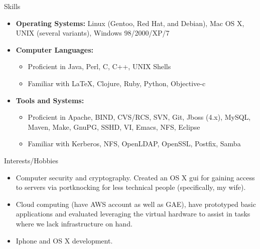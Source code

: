 \documentclass[11pt,oneside]{article}
\newenvironment{ressection}[1]{
	\vspace{4pt}
	{\fontfamily{phv}\selectfont\Large#1}
	\begin{itemize}
	\vspace{3pt}
}{
	\end{itemize}
}
\newcommand{\resitem}[1]{
	\vspace{-4pt}
	\item \begin{flushleft} #1 \end{flushleft}
}
\newcommand{\ressubitem}[1]{
	\vspace{-1pt}
	\item \begin{flushleft} #1 \end{flushleft}
}
\newenvironment{reslist}[1]{
	\resitem{\textbf{#1}}
	\vspace{-5pt}
	\begin{itemize}
}{
	\end{itemize}
}
\begin{document}
\begin{ressection}{Skills}

	\resitem{\textbf{Operating Systems:} Linux (Gentoo, Red Hat, and Debian), Mac OS X, UNIX (several variants), Windows 98/2000/XP/7}

	\begin{reslist}{Computer Languages:}

		\ressubitem{Proficient in Java, Perl, C, C++,  UNIX Shells}

		\ressubitem{Familiar with \LaTeX, Clojure, Ruby, Python, Objective-c}

	\end{reslist}

	\begin{reslist}{Tools and Systems:}

		\ressubitem{Proficient in Apache, BIND, CVS/RCS, SVN, Git, Jboss (4.x), MySQL, Maven, Make, GnuPG, SSHD, VI, Emacs, NFS, Eclipse}

		\ressubitem{Familiar with Kerberos, NFS, OpenLDAP, OpenSSL, Postfix, Samba}

	\end{reslist}


\end{ressection}


\begin{ressection}{Interests/Hobbies}

	\resitem{Computer security and cryptography. Created an OS X gui for gaining access to servers via portknocking for less technical people (specifically, my wife).}
	\resitem{Cloud computing (have AWS account as well as GAE), have prototyped basic applications and evaluated leveraging the virtual hardware to assist in tasks where we lack infrastructure on hand.}
	\resitem{Iphone and OS X development.}

\end{ressection}
\end{document}
